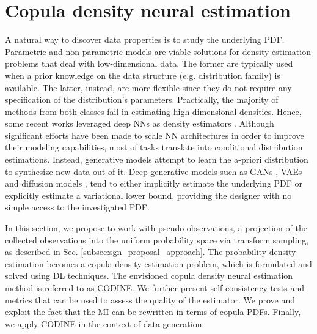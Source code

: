 \section{Copula density neural estimation}
\label{sec:codine}
A natural way to discover data properties is to study the underlying PDF. Parametric and non-parametric models \cite{Silverman86} are viable solutions for density estimation problems that deal with low-dimensional data. The former are typically used when a prior knowledge on the data structure (e.g. distribution family) is available. The latter, instead, are more flexible since they do not require any specification of the distribution's parameters. Practically, the majority of methods from both classes fail in estimating high-dimensional densities. Hence, some recent works leveraged deep NNs as density estimators \cite{PixelRNN,dinh2017density}.
Although significant efforts have been made to scale NN architectures in order to improve their modeling capabilities, most of tasks translate into conditional distribution estimations. 
Instead, generative models attempt to learn the a-priori distribution to synthesize new data out of it. Deep generative models such as GANs \cite{Goodfellow2014}, VAEs \cite{Kingma2013} and diffusion models \cite{Ho2020}, tend to either implicitly estimate the underlying PDF or explicitly estimate a variational lower bound, providing the designer with no simple access to the investigated PDF. 

In this section, we propose to work with pseudo-observations, a projection of the collected observations into the uniform probability space via transform sampling, as described in Sec. \ref{subsec:sgn_proposal_approach}. The probability density estimation becomes a copula density estimation problem, which is formulated and solved using DL techniques. The envisioned copula density neural estimation method is referred to as CODINE. We further present self-consistency tests and metrics that can be used to assess the quality of the estimator. We prove and exploit the fact that the MI can be rewritten in terms of copula PDFs. Finally, we apply CODINE in the context of data generation.

